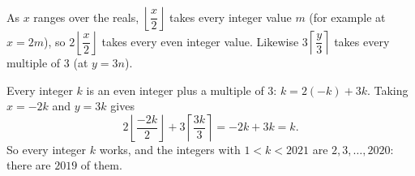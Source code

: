 As $x$ ranges over the reals, $\left\lfloor\dfrac x2\right\rfloor$ takes every integer value $m$ (for example at $x=2m$), so $2\left\lfloor\dfrac x2\right\rfloor$ takes every even integer value. Likewise $3\left\lceil\dfrac y3\right\rceil$ takes every multiple of $3$ (at $y=3n$).

Every integer $k$ is an even integer plus a multiple of $3$: $k=2(-k)+3k$. Taking $x=-2k$ and $y=3k$ gives
\[2\left\lfloor\dfrac{-2k}{2}\right\rfloor+3\left\lceil\dfrac{3k}{3}\right\rceil=-2k+3k=k.\]
So every integer $k$ works, and the integers with $1<k<2021$ are $2,3,\dots,2020$: there are $\boxed{2019}$ of them.
